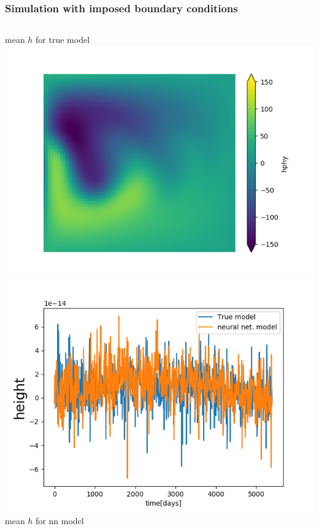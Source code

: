 \documentclass[handout]{beamer}
\begin{document}
\begin{frame}
\frametitle{Simulation with imposed boundary conditions}
\begin{columns}

\centering
{\footnotesize mean $h$ for true model}\\
\includegraphics[width=\textwidth]{./fig/L3/mean-hphy0.png}\\
\includegraphics[width=\textwidth]{./fig/L3/evol-h.png}
\centering
{\footnotesize mean $h$ for nn model}\\

\end{columns}
\end{frame}
\end{document}
